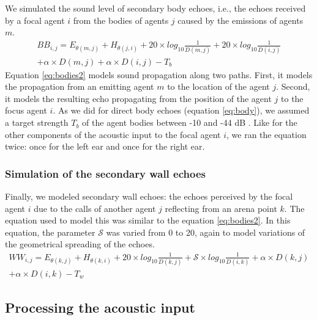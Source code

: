 \documentclass[a4paper, 11pt]{article}
\newcommand{\direction}{\theta}
\newcommand{\emission}{E}
\newcommand{\hearing}{H}
\newcommand{\distance}{D}
\newcommand{\targetstrength}{T}
\newcommand{\wrt}[2]{#1,#2}
\newcommand{\spreading}{\mathcal{S}}
\begin{document}
We simulated the sound level of secondary body echoes, i.e., the echoes received by a focal agent $i$ from the bodies of agents $j$ caused by the emissions of agents $m$.
%
\begin{multline} 
BB_{i,j} = \emission_{\direction(\wrt{m}{j})} + \hearing_{\direction(\wrt{j}{i})} + 20 \times log_{10}\frac{1}{\distance(\wrt{m}{j})} + 20 \times log_{10}\frac{1}{\distance(\wrt{i}{j})} \\ 
+ \alpha \times \distance(\wrt{m}{j})
+ \alpha \times \distance(\wrt{i}{j}) - \targetstrength_b
\label{eq:bodies2}
\end{multline}
%
Equation \ref{eq:bodies2} models sound propagation along two paths. First, it models the propagation from an emitting agent $m$ to the location of the agent $j$. Second, it models the resulting echo propagating from the position of the agent $j$ to the focus agent $i$. As we did for direct body echoes (equation \ref{eq:body}), we assumed a target strength $\targetstrength_b$ of the agent bodies between -10 and -44 dB \citep{Beleyur2019}. Like for the other components of the acoustic input to the focal agent $i$, we ran the equation twice: once for the left ear and once for the right ear.

\subsubsection{Simulation of the secondary wall echoes}

Finally, we modeled secondary wall echoes: the echoes perceived by the focal agent $i$ due to the calls of another agent $j$ reflecting from an arena point $k$. The equation used to model this was similar to the equation \ref{eq:bodies2}. In this equation, the parameter $\spreading$ was varied from 0 to 20, again to model variations of the geometrical spreading of the echoes.
%
\begin{multline} 
WW_{i,j} = \emission_{\direction(\wrt{k}{j})} + \hearing_{\direction(\wrt{k}{i})} + 20 \times log_{10}\frac{1}{\distance(\wrt{k}{j})} + \spreading \times log_{10}\frac{1}{\distance(\wrt{i}{k})}
+ \alpha \times \distance(\wrt{k}{j}) \\ 
+ \alpha \times \distance(\wrt{i}{k}) - \targetstrength_w
\label{eq:walls2}
\end{multline}

\subsection{Processing the acoustic input}
\end{document}
